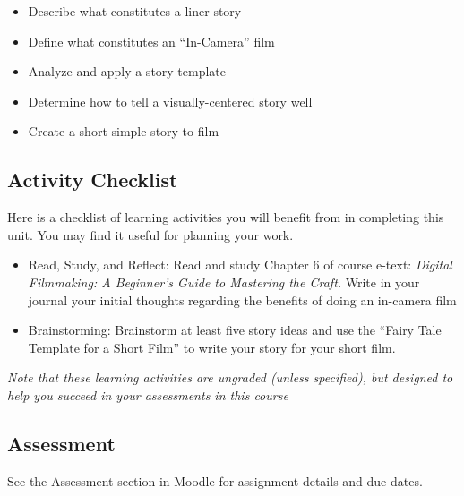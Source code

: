 \documentclass[
]{book}
\providecommand{\tightlist}{%
  \setlength{\itemsep}{0pt}\setlength{\parskip}{0pt}}
\begin{document}
\begin{itemize}
\tightlist
\item
  Describe what constitutes a liner story\\
\item
  Define what constitutes an ``In-Camera'' film\\
\item
  Analyze and apply a story template\\
\item
  Determine how to tell a visually-centered story well\\
\item
  Create a short simple story to film
\end{itemize}

\hypertarget{activity-checklist-5}{%
\subsection*{Activity Checklist}\label{activity-checklist-5}}

\begin{reflect}
Here is a checklist of learning activities you will benefit from in completing this unit. You may find it useful for planning your work.

\begin{itemize}
\tightlist
\item
  Read, Study, and Reflect: Read and study Chapter 6 of course e-text: \emph{Digital Filmmaking: A Beginner's Guide to Mastering the Craft.} Write in your journal your initial thoughts regarding the benefits of doing an in-camera film
\item
  Brainstorming: Brainstorm at least five story ideas and use the ``Fairy Tale Template for a Short Film'' to write your story for your short film.
\end{itemize}

\emph{Note that these learning activities are ungraded (unless specified), but designed to help you succeed in your assessments in this course}
\end{reflect}

\hypertarget{assessment-10}{%
\subsection*{Assessment}\label{assessment-10}}

See the Assessment section in Moodle for assignment details and due dates.
\end{document}
